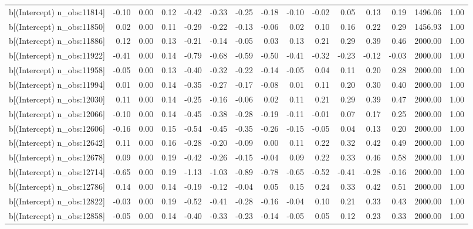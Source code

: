 \begin{table}[ht]
\begin{tabular}{rrrrrrrrrrrrrrr}
  b[(Intercept) n\_obs:11814] & -0.10 & 0.00 & 0.12 & -0.42 & -0.33 & -0.25 & -0.18 & -0.10 & -0.02 & 0.05 & 0.13 & 0.19 & 1496.06 & 1.00 \\ 
  b[(Intercept) n\_obs:11850] & 0.02 & 0.00 & 0.11 & -0.29 & -0.22 & -0.13 & -0.06 & 0.02 & 0.10 & 0.16 & 0.22 & 0.29 & 1456.93 & 1.00 \\ 
  b[(Intercept) n\_obs:11886] & 0.12 & 0.00 & 0.13 & -0.21 & -0.14 & -0.05 & 0.03 & 0.13 & 0.21 & 0.29 & 0.39 & 0.46 & 2000.00 & 1.00 \\ 
  b[(Intercept) n\_obs:11922] & -0.41 & 0.00 & 0.14 & -0.79 & -0.68 & -0.59 & -0.50 & -0.41 & -0.32 & -0.23 & -0.12 & -0.03 & 2000.00 & 1.00 \\ 
  b[(Intercept) n\_obs:11958] & -0.05 & 0.00 & 0.13 & -0.40 & -0.32 & -0.22 & -0.14 & -0.05 & 0.04 & 0.11 & 0.20 & 0.28 & 2000.00 & 1.00 \\ 
  b[(Intercept) n\_obs:11994] & 0.01 & 0.00 & 0.14 & -0.35 & -0.27 & -0.17 & -0.08 & 0.01 & 0.11 & 0.20 & 0.30 & 0.40 & 2000.00 & 1.00 \\ 
  b[(Intercept) n\_obs:12030] & 0.11 & 0.00 & 0.14 & -0.25 & -0.16 & -0.06 & 0.02 & 0.11 & 0.21 & 0.29 & 0.39 & 0.47 & 2000.00 & 1.00 \\ 
  b[(Intercept) n\_obs:12066] & -0.10 & 0.00 & 0.14 & -0.45 & -0.38 & -0.28 & -0.19 & -0.11 & -0.01 & 0.07 & 0.17 & 0.25 & 2000.00 & 1.00 \\ 
  b[(Intercept) n\_obs:12606] & -0.16 & 0.00 & 0.15 & -0.54 & -0.45 & -0.35 & -0.26 & -0.15 & -0.05 & 0.04 & 0.13 & 0.20 & 2000.00 & 1.00 \\ 
  b[(Intercept) n\_obs:12642] & 0.11 & 0.00 & 0.16 & -0.28 & -0.20 & -0.09 & 0.00 & 0.11 & 0.22 & 0.32 & 0.42 & 0.49 & 2000.00 & 1.00 \\ 
  b[(Intercept) n\_obs:12678] & 0.09 & 0.00 & 0.19 & -0.42 & -0.26 & -0.15 & -0.04 & 0.09 & 0.22 & 0.33 & 0.46 & 0.58 & 2000.00 & 1.00 \\ 
  b[(Intercept) n\_obs:12714] & -0.65 & 0.00 & 0.19 & -1.13 & -1.03 & -0.89 & -0.78 & -0.65 & -0.52 & -0.41 & -0.28 & -0.16 & 2000.00 & 1.00 \\ 
  b[(Intercept) n\_obs:12786] & 0.14 & 0.00 & 0.14 & -0.19 & -0.12 & -0.04 & 0.05 & 0.15 & 0.24 & 0.33 & 0.42 & 0.51 & 2000.00 & 1.00 \\ 
  b[(Intercept) n\_obs:12822] & -0.03 & 0.00 & 0.19 & -0.52 & -0.41 & -0.28 & -0.16 & -0.04 & 0.10 & 0.21 & 0.33 & 0.43 & 2000.00 & 1.00 \\ 
  b[(Intercept) n\_obs:12858] & -0.05 & 0.00 & 0.14 & -0.40 & -0.33 & -0.23 & -0.14 & -0.05 & 0.05 & 0.12 & 0.23 & 0.33 & 2000.00 & 1.00 \\ 

\end{tabular}
\end{table}
